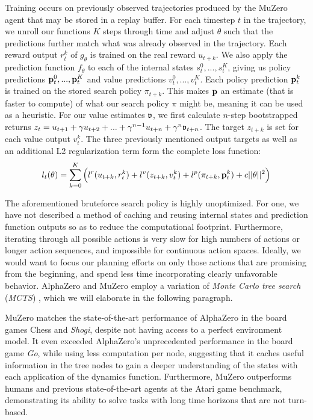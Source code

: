 Training occurs on previously observed trajectories produced by the MuZero agent that may be stored in a replay buffer. For each timestep $t$ in the trajectory, we unroll our functions $K$ steps through time and adjust $\theta$ such that the predictions further match what was already observed in the trajectory. Each reward output $r^k_t$ of $g_\theta$ is trained on the real reward $u_{t+k}$. We also apply the prediction function $f_\theta$ to each of the internal states $s^0_t, ..., s^K_t$, giving us policy predictions $\text{\textbf{p}}^0_t, ..., \text{\textbf{p}}^K_t$ and value predictions $v^0_t, ..., v^K_t$. Each policy prediction $\text{\textbf{p}}^k_t$ is trained on the stored search policy $\pi_{t+k}$. This makes $\text{\textbf{p}}$ an estimate (that is faster to compute) of what our search policy $\pi$ might be, meaning it can be used as a heuristic. For our value estimates $\mathfrak{v}$, we first calculate $n$-step bootstrapped returns $z_t = u_{t+1} + \gamma u_{t+2} + ... + \gamma^{n-1} u_{t+n} + \gamma^n\mathfrak{v}_{t+n}$. The target $z_{t+k}$ is set for each value output $v^k_t$. The three previously mentioned output targets as well as an additional L2 regularization term form the complete loss function:
\begin{equation*}
    l_t(\theta) = \sum^K_{k=0} \left(l^r(u_{t+k}, r_t^k) + l^v(z_{t+k}, v_t^k) + l^p(\pi_{t+k}, \text{\textbf{p}}_t^k) + c||\theta||^2\right)
\end{equation*}

The aforementioned bruteforce search policy is highly unoptimized. For one, we have not described a method of caching and reusing internal states and prediction function outputs so as to reduce the computational footprint. Furthermore, iterating through all possible actions is very slow for high numbers of actions or longer action sequences, and impossible for continuous action spaces. Ideally, we would want to focus our planning efforts on only those actions that are promising from the beginning, and spend less time incorporating clearly unfavorable behavior. AlphaZero and MuZero employ a variation of \textit{Monte Carlo tree search} (\textit{MCTS}) \cite{mcts}, which we will elaborate in the following paragraph.

MuZero matches the state-of-the-art performance of AlphaZero in the board games Chess and \textit{Shogi}, despite not having access to a perfect environment model. It even exceeded AlphaZero's unprecedented performance in the board game \textit{Go}, while using less computation per node, suggesting that it caches useful information in the tree nodes to gain a deeper understanding of the states with each application of the dynamics function. Furthermore, MuZero outperforms humans and previous state-of-the-art agents at the Atari game benchmark, demonstrating its ability to solve tasks with long time horizons that are not turn-based.